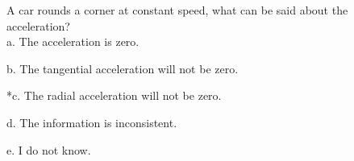 
A car rounds a corner at constant speed, what can be said about the acceleration? \\

a. The acceleration is zero. 

b. The tangential acceleration will not be zero.

*c. The radial acceleration will not be zero.

d. The information is inconsistent.

e. I do not know. \\
